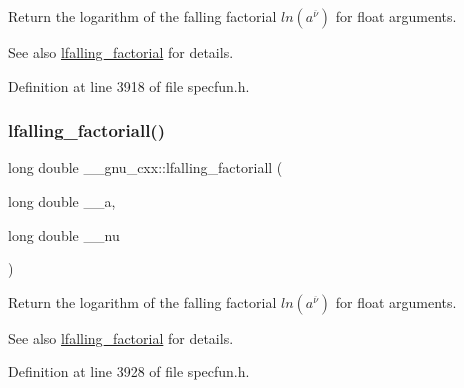 Return the logarithm of the falling factorial $ ln(a^{\overline{\nu}})$ for float arguments.

\begin{DoxySeeAlso}{See also}
\hyperlink{group__gnu__math__spec__func_ga2032c10640d5010666d60d9faec86c32}{lfalling\+\_\+factorial} for details. 
\end{DoxySeeAlso}


Definition at line 3918 of file specfun.\+h.

\mbox{\label{group__gnu__math__spec__func_gaa69b6c70e000b073d7f0f17199b1feb0}} 
\subsubsection{\texorpdfstring{lfalling\+\_\+factoriall()}{lfalling\_factoriall()}}
{\footnotesize\ttfamily long double \+\_\+\+\_\+gnu\+\_\+cxx\+::lfalling\+\_\+factoriall (\begin{DoxyParamCaption}\item[{long double}]{\+\_\+\+\_\+a,  }\item[{long double}]{\+\_\+\+\_\+nu }\end{DoxyParamCaption})\hspace{0.3cm}{\ttfamily [inline]}}

Return the logarithm of the falling factorial $ ln(a^{\overline{\nu}})$ for float arguments.

\begin{DoxySeeAlso}{See also}
\hyperlink{group__gnu__math__spec__func_ga2032c10640d5010666d60d9faec86c32}{lfalling\+\_\+factorial} for details. 
\end{DoxySeeAlso}


Definition at line 3928 of file specfun.\+h.

\mbox{\label{group__gnu__math__spec__func_ga40fa5127f7c419ed1d8f1c6a6f96ea9b}} 
